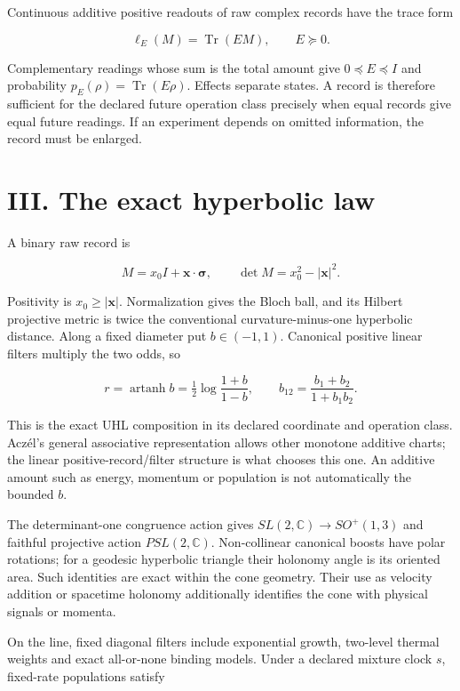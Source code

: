 \documentclass[
  11pt,
  a4paper,
]{article}
\newcounter{none} %
\begin{document}
Continuous additive positive readouts of raw complex records have the trace form

\[\ell_E(M)=\operatorname{Tr}(EM),\qquad E\succeq0.\]

Complementary readings whose sum is the total amount give \(0\preceq E\preceq I\) and probability \(p_E(\rho)=\operatorname{Tr}(E\rho)\). Effects separate states. A record is therefore sufficient for the declared future operation class precisely when equal records give equal future readings. If an experiment depends on omitted information, the record must be enlarged.

\section{III. The exact hyperbolic law}\label{iii.-the-exact-hyperbolic-law}

A binary raw record is

\[M=x_0I+\mathbf x\cdot\boldsymbol\sigma,\qquad
\det M=x_0^2-|\mathbf x|^2.\]

Positivity is \(x_0\ge|\mathbf x|\). Normalization gives the Bloch ball, and its Hilbert projective metric is twice the conventional curvature-minus-one hyperbolic distance. Along a fixed diameter put \(b\in(-1,1)\). Canonical positive linear filters multiply the two odds, so

\[r=\operatorname{artanh}b=\tfrac12\log\frac{1+b}{1-b},
\qquad b_{12}=\frac{b_1+b_2}{1+b_1b_2}.\]

This is the exact UHL composition in its declared coordinate and operation class. Aczél's general associative representation allows other monotone additive charts; the linear positive-record/filter structure is what chooses this one. An additive amount such as energy, momentum or population is not automatically the bounded \(b\).

The determinant-one congruence action gives \(SL(2,\mathbb C)\to SO^+(1,3)\) and faithful projective action \(PSL(2,\mathbb C)\). Non-collinear canonical boosts have polar rotations; for a geodesic hyperbolic triangle their holonomy angle is its oriented area. Such identities are exact within the cone geometry. Their use as velocity addition or spacetime holonomy additionally identifies the cone with physical signals or momenta.

On the line, fixed diagonal filters include exponential growth, two-level thermal weights and exact all-or-none binding models. Under a declared mixture clock \(s\), fixed-rate populations satisfy
\end{document}
